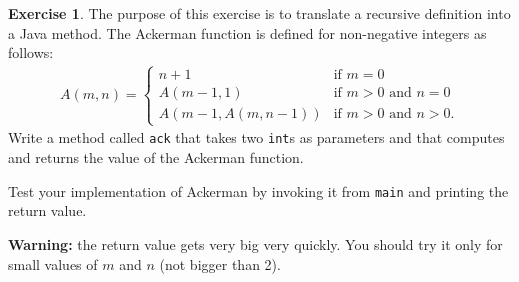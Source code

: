 \documentclass[12pt]{book}
\def\WARNING{\textbf{Warning:}}
\theoremstyle{definition}
\newtheorem{excz}{Exercise}[chapter]
\newenvironment{exercise}{\bigskip\begin{excz}\mbox{}}{\end{excz}}
\begin{document}
\begin{exercise}
The purpose of this exercise is to translate a recursive definition
into a Java method.  The Ackerman function is defined for non-negative
integers as follows:
%
\begin{eqnarray}
A(m, n) = \begin{cases} 
              n+1 & \mbox{if } m = 0 \\ 
        A(m-1, 1) & \mbox{if } m > 0 \mbox{ and } n = 0 \\ 
A(m-1, A(m, n-1)) & \mbox{if } m > 0 \mbox{ and } n > 0.
\end{cases} 
\end{eqnarray}
%
Write a method called {\tt ack} that takes two {\tt int}s as
parameters and that computes and returns the value
of the Ackerman function.

Test your implementation of Ackerman by invoking it
from {\tt main} and printing the return value.  

\WARNING{} the return value gets very big very quickly.  You should try it
only for small values of $m$ and $n$ (not bigger than 2).

\end{exercise}
\end{document}
